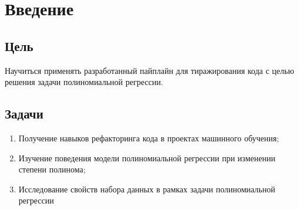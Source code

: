 \chapter{Введение}
\label{ch:intro}

\section{Цель}  

Научиться применять разработанный
пайплайн для тиражирования кода с целью решения задачи полиномиальной
регрессии.

\section{Задачи} 

\begin{enumerate} 
\item Получение навыков рефакторинга кода в проектах машинного
обучения;
\item Изучение поведения модели полиномиальной регрессии при
изменении степени полинома;
\item Исследование свойств набора данных в рамках задачи полиномиальной
регрессии
\end{enumerate}
  

\endinput 